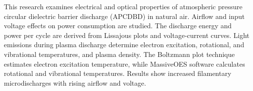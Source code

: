 This research examines electrical and optical properties of atmospheric pressure circular dielectric barrier discharge (APCDBD) in natural air. Airflow and input voltage effects on power consumption are studied. The discharge energy and power per cycle are derived from Lissajous plots and voltage-current curves. Light emissions during plasma discharge determine electron excitation, rotational, and vibrational temperatures, and plasma density. The Boltzmann plot technique estimates electron excitation temperature, while MassiveOES software calculates rotational and vibrational temperatures. Results show increased filamentary microdischarges with rising airflow and voltage. \\
